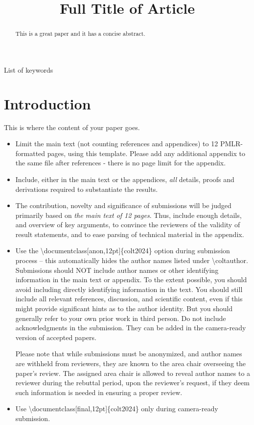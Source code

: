 \documentclass[anon,12pt]{colt2024} %
\title[Short Title]{Full Title of Article}
\begin{document}
\maketitle

\begin{abstract}%
  This is a great paper and it has a concise abstract.%
\end{abstract}

\begin{keywords}%
  List of keywords%
\end{keywords}

\section{Introduction}

This is where the content of your paper goes.
\begin{itemize}
  \item Limit the main text (not counting references and appendices) to 12 PMLR-formatted pages, using this template. Please add any additional appendix to the same file after references - there is no page limit for the appendix.
  \item Include, either in the main text or the appendices, \emph{all} details, proofs and derivations required to substantiate the results.
  \item The contribution, novelty and significance of submissions will be judged primarily based on
\textit{the main text of 12 pages}. Thus, include enough details, and overview of key arguments, 
to convince the reviewers of the validity of result statements, and to ease parsing of technical material in the appendix.
  \item Use the \textbackslash documentclass[anon,12pt]\{colt2024\} option during submission process -- this automatically hides the author names listed under \textbackslash coltauthor. Submissions should NOT include author names or other identifying information in the main text or appendix. To the extent possible, you should avoid including directly identifying information in the text. You should still include all relevant references, discussion, and scientific content, even if this might provide significant hints as to the author identity. But you should generally refer to your own prior work in third person. Do not include acknowledgments in the submission. They can be added in the camera-ready version of accepted papers. 
  
  Please note that while submissions must be anonymized, and author names are withheld from reviewers, they are known to the area chair overseeing the paper’s review.  The assigned area chair is allowed to reveal author names to a reviewer during the rebuttal period, upon the reviewer’s request, if they deem such information is needed in ensuring a proper review.  
  \item Use \textbackslash documentclass[final,12pt]\{colt2024\} only during camera-ready submission.
\end{itemize}
\end{document}
